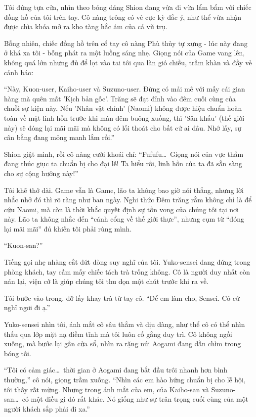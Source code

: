 \documentclass[../main.tex]{subfiles}
\begin{document}
Tôi đứng tựa cửa, nhìn theo bóng dáng Shion đang vừa đi vừa lẩm bẩm với chiếc đồng hồ của tôi trên tay. Cô nàng trông có vẻ cực kỳ đắc ý, như thể vừa nhận được chìa khóa mở ra kho tàng hắc ám của cả vũ trụ.

Bỗng nhiên, chiếc đồng hồ trên cổ tay cô nàng Phù thủy tự xưng - lúc này đang ở khá xa tôi - bỗng phát ra một luồng sáng nhẹ. Giọng nói của Game vang lên, không quá lớn nhưng đủ để lọt vào tai tôi qua làn gió chiều, trầm khàn và đầy vẻ cảnh báo:

``Này, Kuon-user, Kaiho-user và Suzuno-user. Đừng có mải mê với mấy cái gian hàng mà quên mất 'Kịch bản gốc'. Trăng sẽ đạt đỉnh vào đêm cuối cùng của chuỗi sự kiện này. Nếu 'Nhân vật chính' (Naomi) không được hiệu chuẩn hoàn toàn về mặt linh hồn trước khi màn đêm buông xuống, thì 'Sân khấu' (thế giới này) sẽ đóng lại mãi mãi mà không có lối thoát cho bất cứ ai đâu. Nhớ lấy, sự cân bằng đang mỏng manh lắm rồi.''

Shion giật mình, rồi cô nàng cười khoái chí: ``Fufufu\dots\ Giọng nói của vực thẳm đang thúc giục ta chuẩn bị cho đại lễ! Ta hiểu rồi, linh hồn của ta đã sẵn sàng cho sự cộng hưởng này!''

Tôi khẽ thở dài. Game vẫn là Game, lão ta không bao giờ nói thẳng, nhưng lời nhắc nhở đó thì rõ ràng như ban ngày. Nghi thức Đêm trăng rằm không chỉ là để cứu Naomi, mà còn là thời khắc quyết định sự tồn vong của chúng tôi tại nơi này. Lão ta không nhắc đến ``cánh cổng về thế giới thực'', nhưng cụm từ ``đóng lại mãi mãi'' đủ khiến tôi phải rùng mình.

``Kuon-san?''

Tiếng gọi nhẹ nhàng cắt đứt dòng suy nghĩ của tôi. Yuko-sensei đang đứng trong phòng khách, tay cầm mấy chiếc tách trà trống không. Cô là người duy nhất còn nán lại, viện cớ là giúp chúng tôi thu dọn một chút trước khi ra về.

Tôi bước vào trong, đỡ lấy khay trà từ tay cô. ``Để em làm cho, Sensei. Cô cứ nghỉ ngơi đi ạ.''

Yuko-sensei nhìn tôi, ánh mắt cô sâu thẳm và dịu dàng, như thể cô có thể nhìn thấu qua lớp mặt nạ điềm tĩnh mà tôi luôn cố gắng duy trì. Cô không ngồi xuống, mà bước lại gần cửa sổ, nhìn ra rặng núi Aogami đang dần chìm trong bóng tối.

``Tôi có cảm giác\dots\ thời gian ở Aogami đang bắt đầu trôi nhanh hơn bình thường,'' cô nói, giọng trầm xuống. ``Nhìn các em hào hứng chuẩn bị cho lễ hội, tôi thấy rất mừng. Nhưng trong ánh mắt của em, của Kaiho-san và Suzuno-san\dots\ có một điều gì đó rất khác. Nó giống như sự trân trọng cuối cùng của một người khách sắp phải đi xa.''
\end{document}
